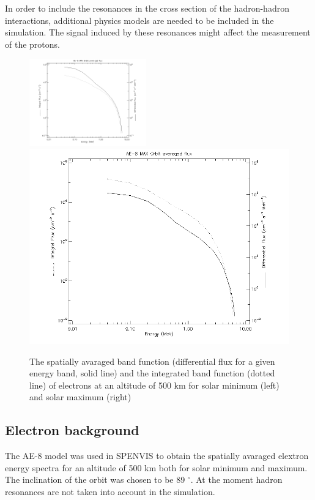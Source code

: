 \documentclass[12pt, a4paper,titlepage]{article}
\numberwithin{equation}{section}
\numberwithin{figure}{section}
\begin{document}
In order to include the resonances in the cross section of the hadron-hadron interactions, additional physics models are needed to be included in the simulation. The signal induced by these resonances might affect the measurement of the protons.

\begin{figure}[htbp]
 \centering %
 \includegraphics[width=0.45\textwidth,origin=c,angle=0]{images/alt_500km_AE-8_MIN_averaged_spectra.png}
 \qquad
 \includegraphics[width=.45\textwidth,origin=c]{images/alt_500km_AE-8_MAX_averaged_spectra.png} 
 \caption{\label{fig:band500e} The spatially avaraged band function (differential flux for a given energy band, solid line) and the integrated band function (dotted line) of electrons at an altitude of 500 km for solar minimum (left) and solar maximum (right) }
 \end{figure}

\subsection{Electron background}

The AE-8 model was used in SPENVIS to obtain the spatially avaraged elextron energy spectra for an altitude of 500 km both for solar minimum and maximum. The inclination of the orbit was chosen to be 89 $^{\circ}$. At the moment hadron resonances are not taken into account in the simulation.
\end{document}

